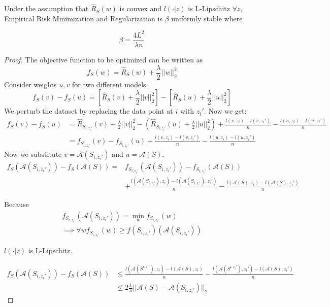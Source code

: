 \documentclass{article}
\begin{document}
\begin{thm}
Under the assumption that $\hat{R}_S(w)$ is convex and $l(\cdot|z)$ is L-Lipschitz $\forall z$, Empirical Risk Minimization and Regularization is $\beta$ uniformly stable where

\[
\beta = \frac{4L^2}{\lambda n}
\]
\end{thm}
\begin{proof}
The objective function to be optimized can be written as
$$f_S(w)=\hat{R}_S(w) + \frac{\lambda}{2}||w||_2^2$$
Consider weights $u,v$ for two different models.
$$f_S(v) - f_S(u) = [\hat{R}_S(v) + \frac{\lambda}{2}||v||_2^2] - [\hat{R}_S(u) + \frac{\lambda}{2}||u||_2^2]$$
We perturb the dataset by replacing the data point at $i$ with $z_i'$. Now we get:
\begin{align*}
    f_S(v) - f_S(u) &= \hat{R}_{S_{i,z_i'}}(v) + \frac{\lambda}{2}||v||_2^2 - (\hat{R}_{S_{i,z_i'}}(u) + \frac{\lambda}{2}||u||^2_2) + \frac{l(v, z_i) - l(v, z_i')}{n} - \frac{l(u, z_i) - l(u,z_i')}{n} \\
    &= f_{S_{i,z_i'}}(v) - f_{S_{i,z_i'}}(u) + \frac{l(v, z_i) - l(v, z_i')}{n} - \frac{l(u, z_i) - l(u,z_i')}{n}
\end{align*}
Now we substitute $v=\mathcal{A}(S_{i,z_i'})$ and $u=\mathcal{A}(S)$.
\begin{align*}
    f_S(\mathcal{A}(S_{i,z_i'})) - f_S(\mathcal{A}(S)) 
    =& f_{S_{i,z_i'}}(\mathcal{A}(S_{i,z_i'})) - f_{S_{i,z_i'}}(\mathcal{A}(S)) \\ &+ \frac{l(\mathcal{A}(S_{i,z_i'}), z_i) - l(\mathcal{A}(S_{i,z_i'}), z_i')}{n} - \frac{l(\mathcal{A}(S), z_i) - l(\mathcal{A}(S),z_i')}{n}
\end{align*}

Because
\begin{align*}
f_{S_{i,z_i'}}(\mathcal{A}(S_{i, z_i'})) = \min_w f_{S_{i,z_i'}}(w) \\
\implies \forall w f_{S_{i,z_i'}}(w) \geq f(S_{i,z_i'})(\mathcal{A}(S_{i, z_i'}))
\end{align*}

\begin{assm}
    $l(\cdot|z)$ is L-Lipschitz.
\end{assm}

\begin{align}
f_S(\mathcal{A}(S_{i,z_i'})) - f_S(\mathcal{A}(S)) &\leq \frac{l(\mathcal{A}(S^{i,z_i'}), z_i) - l(\mathcal{A}(S), z_i)}{n} - \frac{l(\mathcal{A}(S^{i,z_i'}), z_i') - l(\mathcal{A}(S),z_i')}{n} \nonumber\\
&\leq 2\frac{L}{n}||\mathcal{A}(S)-\mathcal{A}(S_{i,z_i'})||_2 \label{eq:one}
\end{align}


\end{proof}
\end{document}
